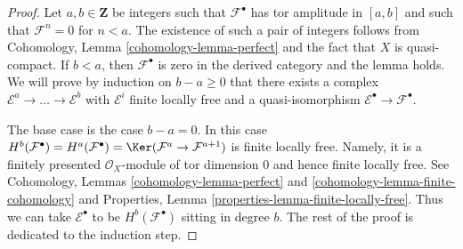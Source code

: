 \begin{proof}
Let $a, b \in \mathbf{Z}$ be integers such that $\mathcal{F}^\bullet$
has tor amplitude in $[a, b]$ and such that $\mathcal{F}^n = 0$ for
$n < a$. The existence of such a pair of integers
follows from Cohomology, Lemma \ref{cohomology-lemma-perfect}
and the fact that $X$ is quasi-compact.
If $b < a$, then $\mathcal{F}^\bullet$ is zero in the
derived category and the lemma holds.
We will prove by induction on
$b - a \geq 0$ that there exists a complex
$\mathcal{E}^a \to \ldots \to \mathcal{E}^b$
with $\mathcal{E}^i$ finite locally free
and a quasi-isomorphism $\mathcal{E}^\bullet \to \mathcal{F}^\bullet$.

\medskip\noindent
The base case is the case $b - a = 0$. In this case
$H^b(\mathcal{F}^\bullet) = H^a(\mathcal{F}^\bullet) =
\Ker(\mathcal{F}^a \to \mathcal{F}^{a + 1})$
is finite locally free. Namely, it is a finitely presented
$\mathcal{O}_X$-module of tor dimension $0$ and hence finite
locally free. See Cohomology, Lemmas \ref{cohomology-lemma-perfect} and
\ref{cohomology-lemma-finite-cohomology} and
Properties, Lemma \ref{properties-lemma-finite-locally-free}.
Thus we can take $\mathcal{E}^\bullet$ to be
$H^b(\mathcal{F}^\bullet)$ sitting in degree $b$.
The rest of the proof is dedicated to the induction step.


\end{proof}
